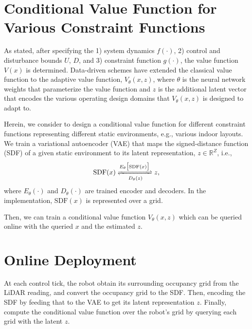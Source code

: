 \documentclass[12pt]{article}
\begin{document}
\section{Conditional Value Function for Various Constraint Functions}
As stated, after specifying the 1) system dynamics $f(\cdot)$, 2) control and disturbance bounds $U$, $D$, and 3) constraint function $g(\cdot)$, the value function $V(x)$ is determined. Data-driven schemes have extended the classical value function to the adaptive value function, $V_{\theta}(x,z)$, where $\theta$ is the neural network weights that parameterize the value function and $z$ is the additional latent vector that encodes the various operating design domains that $V_{\theta}(x,z)$ is designed to adapt to.

Herein, we consider to design a conditional value function for different constraint functions representing different static environments, e.g., various indoor layouts. We train a variational autoencoder (VAE) that maps the signed-distance function (SDF) of a given static environment to its latent representation, $z\in\mathbb{R}^{Z}$, i.e., 
\begin{equation}
    \text{SDF}(x) \xrightleftharpoons[D_{\theta}(z)]{E_{\theta}\bigl[\text{SDF}(x)\bigr]} z,
\end{equation}
where $E_{\theta}(\cdot)$ and $D_{\theta}(\cdot)$ are trained encoder and decoders. In the implementation, $\text{SDF}(x)$ is represented over a grid.

Then, we can train a conditional value function $V_{\theta}(x,z)$ which can be queried online with the queried $x$ and the estimated $z$.

\section{Online Deployment}
At each control tick, the robot obtain its surrounding occupancy grid from the LiDAR reading, and convert the occupancy grid to the SDF. Then, encoding the SDF by feeding that to the VAE to get its latent representation $z$. Finally, compute the conditional value function over the robot's grid by querying each grid with the latent $z$.
\end{document}
